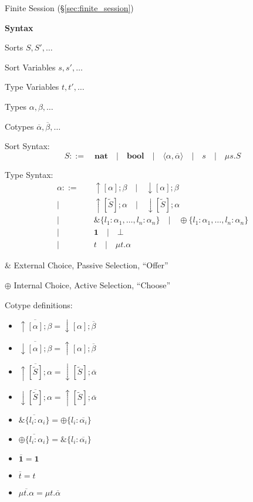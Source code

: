 Finite Session (\S\ref{sec:finite_session})


\textbf{Syntax}
\cite{honda-vasconcelos-kubo98}

Sorts $S, S', \ldots$

Sort Variables $s, s', \dots$

Type Variables $t, t', \ldots$

Types $\alpha, \beta, \ldots$

Cotypes $\overline{\alpha}, \overline{\beta}, \ldots$ %

Sort Syntax:
\cite{honda-vasconcelos-kubo98}
\[
  S ::= \quad \mathbf{nat} \quad
      | \quad \mathbf{bool} \quad
      | \quad \langle \alpha, \overline{\alpha} \rangle \quad
      | \quad s \quad
      | \quad \mu s.S
\]

Type Syntax:
\cite{honda-vasconcelos-kubo98}
\[
\begin{split}
  \alpha  ::=&\quad \uparrow[\alpha]; \beta \quad
            | \quad \downarrow[\alpha]; \beta \\
            |&\quad \uparrow[\tilde{S}]; \alpha \quad
            | \quad \downarrow[\tilde{S}]; \alpha \\
            |&\quad \& \{ l_1 : \alpha_1, \ldots, l_n : \alpha_n \} \quad
            | \quad \oplus \{ l_1 : \alpha_1, \ldots, l_n : \alpha_n \} \\
            |&\quad \mathbf{1} \quad
            | \quad \bot \quad \\
            |&\quad t \quad
            | \quad \mu t.\alpha
\end{split}
\]

$\&$ External Choice, Passive Selection, ``Offer''

$\oplus$ Internal Choice, Active Selection, ``Choose''


Cotype definitions:
\cite{honda-vasconcelos-kubo98}
\begin{itemize}
  \item $\overline{\uparrow[\alpha]; \beta}
    = \downarrow[\alpha]; \overline{\beta}$
  \item $\overline{\downarrow[\alpha]; \beta}
    = \uparrow[\alpha]; \overline{\beta}$
  \item $\overline{\uparrow[\tilde{S}]; \alpha}
    = \downarrow[\tilde{S}]; \overline{\alpha}$
  \item $\overline{\downarrow[\tilde{S}]; \alpha}
    = \uparrow[\tilde{S}]; \overline{\alpha}$
  \item $\overline{\& \{ l_i : \alpha_i \}}
    = \oplus \{ l_i : \overline{\alpha_i} \}$
  \item $\overline{\oplus \{ l_i : \alpha_i \}}
    = \& \{ l_i : \overline{\alpha_i} \}$
  \item $\overline{\mathbf{1}} = \mathbf{1}$
  \item $\overline{t} = t$
  \item $\overline{\mu t.\alpha} = \mu t.\overline{\alpha}$
\end{itemize}

